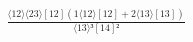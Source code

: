 \documentclass[varwidth, border=5pt]{standalone}
\begin{document}
\begin{my}
$\begin{gathered}
\scriptscriptstyle\frac{⟨12⟩⟨23⟩[12](1⟨12⟩[12]+2⟨13⟩[13])}{⟨13⟩³[14]²}
\end{gathered}$
\end{my}
\end{document}

